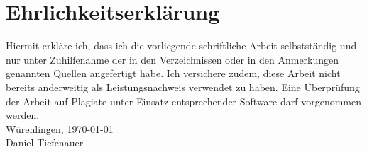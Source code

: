 \section{Ehrlichkeitserklärung}
Hiermit erkläre ich, dass ich die vorliegende schriftliche Arbeit
selbstständig und nur unter Zuhilfenahme der in den Verzeichnissen oder
in den Anmerkungen genannten Quellen angefertigt habe. Ich versichere
zudem, diese Arbeit nicht bereits anderweitig als Leistungsnachweis
verwendet zu haben. Eine Überprüfung der Arbeit auf Plagiate unter
Einsatz entsprechender Software darf vorgenommen werden.\\
Würenlingen, \today\\[4\baselineskip]
Daniel Tiefenauer